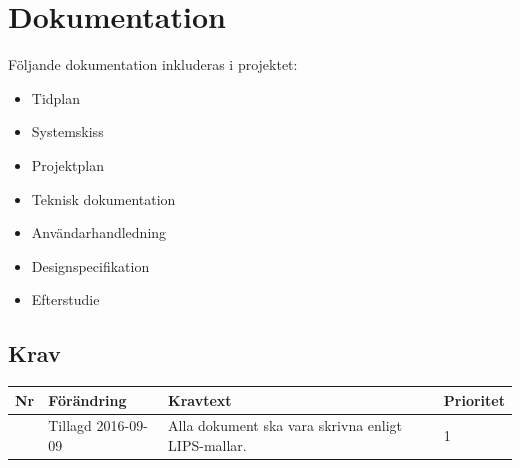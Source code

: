 \documentclass[a4paper,titlepage,12pt]{article}
\newcounter{reqNr}
\newcommand{\nextReqNr}{\stepcounter{reqNr}\arabic{reqNr}}
\begin{document}
	\section{Dokumentation}
    Följande dokumentation inkluderas i projektet:
    \begin{itemize}
		\item Tidplan 
		\item Systemskiss 
		\item Projektplan
		\item Teknisk dokumentation 
		\item Användarhandledning 
        \item Designspecifikation
        \item Efterstudie
    \end{itemize}

	\subsection{Krav}
	\begin{table}[h]
		\label{tab:Krav dokumentation}
		\begin{tabularx}{\textwidth}{|c|l|X|l|}
			\hline
			\textbf{Nr} & \textbf{Förändring} & \textbf{Kravtext} & \textbf{Prioritet} 
				\\ \hline

			\nextReqNr & Tillagd 2016-09-09 & Alla dokument ska vara skrivna
            enligt LIPS-mallar. & 1
				\\ \hline

		\end{tabularx}
	\end{table}
\end{document}
